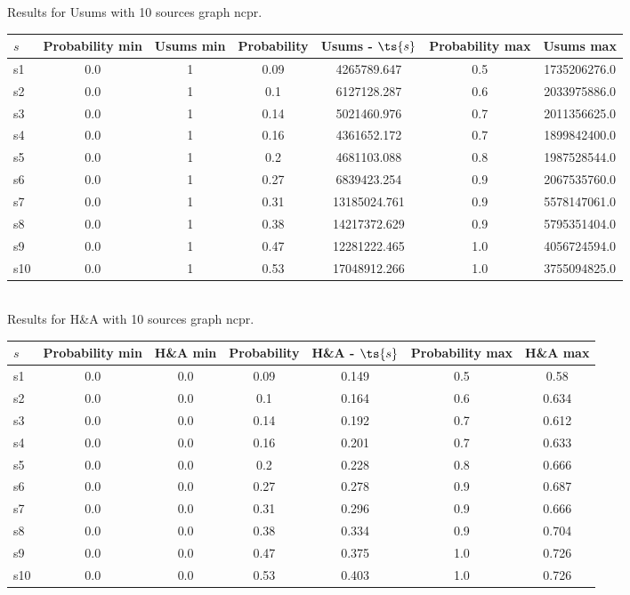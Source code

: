 \documentclass{article}
\begin{document}
\noindent Results for Usums with 10 sources graph ncpr.

\noindent\begin{tabular}{|l|c|c|c|c|c|c|}
\hline
$s$& Probability min & Usums min & Probability & Usums - $\ts{s}$ & Probability max & Usums max\\
\hline
s1 &0.0 & 1 & 0.09 & 4265789.647 & 0.5 & 1735206276.0\\
\hline
s2 &0.0 & 1 & 0.1 & 6127128.287 & 0.6 & 2033975886.0\\
\hline
s3 &0.0 & 1 & 0.14 & 5021460.976 & 0.7 & 2011356625.0\\
\hline
s4 &0.0 & 1 & 0.16 & 4361652.172 & 0.7 & 1899842400.0\\
\hline
s5 &0.0 & 1 & 0.2 & 4681103.088 & 0.8 & 1987528544.0\\
\hline
s6 &0.0 & 1 & 0.27 & 6839423.254 & 0.9 & 2067535760.0\\
\hline
s7 &0.0 & 1 & 0.31 & 13185024.761 & 0.9 & 5578147061.0\\
\hline
s8 &0.0 & 1 & 0.38 & 14217372.629 & 0.9 & 5795351404.0\\
\hline
s9 &0.0 & 1 & 0.47 & 12281222.465 & 1.0 & 4056724594.0\\
\hline
s10 &0.0 & 1 & 0.53 & 17048912.266 & 1.0 & 3755094825.0\\
\hline
\end{tabular}\\

\noindent Results for H\&A with 10 sources graph ncpr.

\noindent\begin{tabular}{|l|c|c|c|c|c|c|}
\hline
$s$& Probability min & H\&A min & Probability & H\&A - $\ts{s}$ & Probability max & H\&A max\\
\hline
s1 &0.0 & 0.0 & 0.09 & 0.149 & 0.5 & 0.58\\
\hline
s2 &0.0 & 0.0 & 0.1 & 0.164 & 0.6 & 0.634\\
\hline
s3 &0.0 & 0.0 & 0.14 & 0.192 & 0.7 & 0.612\\
\hline
s4 &0.0 & 0.0 & 0.16 & 0.201 & 0.7 & 0.633\\
\hline
s5 &0.0 & 0.0 & 0.2 & 0.228 & 0.8 & 0.666\\
\hline
s6 &0.0 & 0.0 & 0.27 & 0.278 & 0.9 & 0.687\\
\hline
s7 &0.0 & 0.0 & 0.31 & 0.296 & 0.9 & 0.666\\
\hline
s8 &0.0 & 0.0 & 0.38 & 0.334 & 0.9 & 0.704\\
\hline
s9 &0.0 & 0.0 & 0.47 & 0.375 & 1.0 & 0.726\\
\hline
s10 &0.0 & 0.0 & 0.53 & 0.403 & 1.0 & 0.726\\
\hline
\end{tabular}\\
\end{document}
